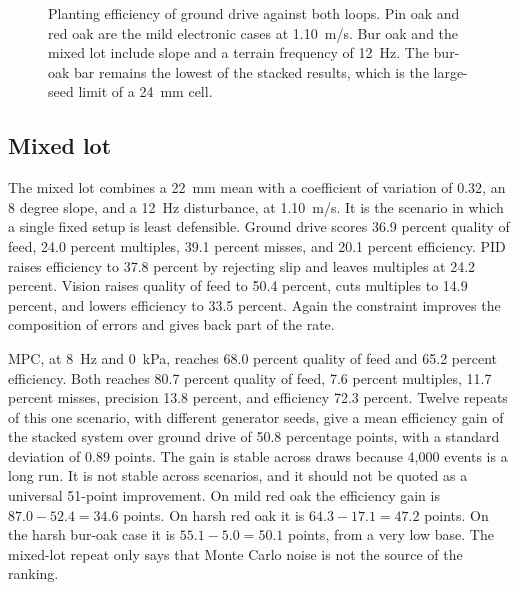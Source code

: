 \begin{figure}[htbp]
\centering
{}
\caption{Planting efficiency of ground drive against both loops. Pin oak and red oak are the mild electronic cases at 1.10~m/s. Bur oak and the mixed lot include slope and a terrain frequency of 12~Hz. The bur-oak bar remains the lowest of the stacked results, which is the large-seed limit of a 24~mm cell.}
\label{fig:compare}
\end{figure}

\subsection{Mixed lot}

The mixed lot combines a 22~mm mean with a coefficient of variation of 0.32, an 8 degree slope, and a 12~Hz disturbance, at 1.10~m/s. It is the scenario in which a single fixed setup is least defensible. Ground drive scores 36.9 percent quality of feed, 24.0 percent multiples, 39.1 percent misses, and 20.1 percent efficiency. PID raises efficiency to 37.8 percent by rejecting slip and leaves multiples at 24.2 percent. Vision raises quality of feed to 50.4 percent, cuts multiples to 14.9 percent, and lowers efficiency to 33.5 percent. Again the constraint improves the composition of errors and gives back part of the rate.

MPC, at 8~Hz and 0~kPa, reaches 68.0 percent quality of feed and 65.2 percent efficiency. Both reaches 80.7 percent quality of feed, 7.6 percent multiples, 11.7 percent misses, precision 13.8 percent, and efficiency 72.3 percent. Twelve repeats of this one scenario, with different generator seeds, give a mean efficiency gain of the stacked system over ground drive of 50.8 percentage points, with a standard deviation of 0.89 points. The gain is stable across draws because 4{,}000 events is a long run. It is not stable across scenarios, and it should not be quoted as a universal 51-point improvement. On mild red oak the efficiency gain is $87.0-52.4=34.6$ points. On harsh red oak it is $64.3-17.1=47.2$ points. On the harsh bur-oak case it is $55.1-5.0=50.1$ points, from a very low base. The mixed-lot repeat only says that Monte Carlo noise is not the source of the ranking.

